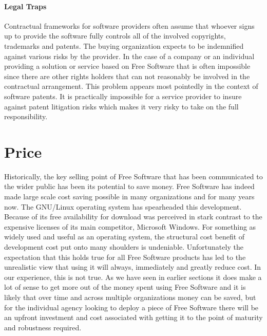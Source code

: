 \paragraph*{Legal Traps}

Contractual frameworks for software providers often assume
that whoever signs up to provide the software fully controls all of the involved 
copyrights, trademarks and patents. The buying organization expects to be indemnified against various
risks by the provider. In the case of a company or an individual providing a solution
or service based on Free Software that is often impossible since there are other
rights holders that can not reasonably be involved in the contractual arrangement.
This problem appears most pointedly in the context of software patents. It is practically
impossible for a service provider to insure against patent litigation risks which makes
it very risky to take on the full responsibility.

\section*{Price}

Historically, the key selling point of Free Software that has been communicated
to the wider public has been its potential to save money.
Free Software has indeed made large scale cost
saving possible in many organizations and for many years now. 
The GNU/Linux operating system has spearheaded this development.
Because of its free availability for download was perceived in stark contrast 
to the expensive licenses of its main competitor, Microsoft Windows.
For something as
widely used and useful as an operating system, the structural cost benefit of
development cost put onto many shoulders is undeniable.  Unfortunately the
expectation that this holds true for all Free Software products has led to the
unrealistic view that using it will always, immediately and greatly reduce
cost. In our experience, this is not true. As we have seen in earlier sections
it does make a lot of sense to get more out of the money spent using Free
Software and it is likely that over time and across multiple organizations
money can be saved, but for the individual agency looking to deploy a piece of
Free Software there will be an upfront investment and cost associated with
getting it to the point of maturity and robustness required.

